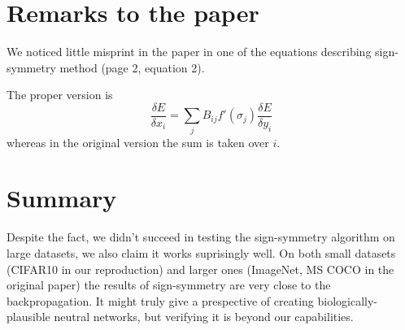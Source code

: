 \documentclass{article} %
\begin{document}
\section{Remarks to the paper}
We noticed little misprint in the paper in one of the equations describing sign-symmetry method (page 2, equation 2).

The proper version is
$$
\frac{\delta E}{\delta x_i} = \sum_j B_{ij}f'(\sigma_j)\frac{\delta E}{\delta{y_i}}
$$ 
whereas in the original version the sum is taken over $i$.

\section{Summary}
Despite the fact, we didn't succeed in testing the sign-symmetry algorithm on large datasets, we also claim it works suprisingly well. On both small datasets (CIFAR10 in our reproduction) and larger ones (ImageNet, MS COCO in the original paper) the results of sign-symmetry are very close to the backpropagation. It might truly give a prespective of creating biologically-plausible neutral networks, but verifying it is beyond our capabilities.






%
%
\end{document}
